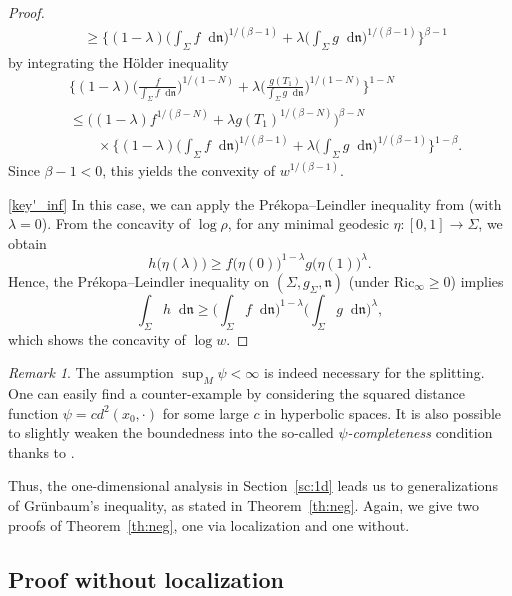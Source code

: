 \documentclass[sts]{imsart}
\theoremstyle{definition}
\theoremstyle{remark}
\newtheorem{remark}[theorem]{Remark}
\newcommand{\fn}{\mathfrak{n}}
\newcommand{\lra}{\longrightarrow}
\newcommand{\Ric}{\mathrm{Ric}}
\newcommand*\diff{\mathop{}\!\mathrm{d}}
\begin{document}
\begin{proof}
\begin{align*}
&\ge \biggl\{ (1-\lambda) \biggl( \int_\Sigma f \diff\fn \biggr)^{1/(\beta -1)} +\lambda \biggl( \int_\Sigma g \diff\fn \biggr)^{1/(\beta -1)} \biggr\}^{\beta -1}
\end{align*}
by integrating the H\"older inequality
\begin{align*}
&\biggl\{ (1-\lambda) \biggl( \frac{f}{\int_\Sigma f \diff\fn} \biggr)^{1/(1-N)}
 +\lambda \biggl( \frac{g(T_1)}{\int_\Sigma g \diff\fn} \biggr)^{1/(1-N)} \biggr\}^{1-N} \\
&\le \bigl( (1-\lambda) f^{1/(\beta-N)} +\lambda g(T_1)^{1/(\beta-N)} \bigr)^{\beta -N} \\
&\qquad \times
\biggl\{ (1-\lambda) \biggl( \int_\Sigma f \diff\fn \biggr)^{1/(\beta -1)} +\lambda \biggl( \int_\Sigma g \diff\fn \biggr)^{1/(\beta -1)} \biggr\}^{1-\beta}.
\end{align*}
Since $\beta -1<0$, this yields the convexity of $w^{1/(\beta -1)}$.

\eqref{key'_inf}
In this case, we can apply the Pr\'ekopa--Leindler inequality from \cite[Theorem~1.4]{CMS06} (with $\lambda=0$).
From the concavity of $\log\rho$, for any minimal geodesic $\eta\colon [0,1]\lra \Sigma$, we obtain
\[
h\bigl( \eta(\lambda) \bigr) 
\ge f\bigl( \eta(0) \bigr)^{1-\lambda} g\bigl( \eta(1) \bigr)^{\lambda}.
\]
Hence, the Pr\'ekopa--Leindler inequality on $(\Sigma,g_{\Sigma},\fn)$ (under $\Ric_{\infty} \ge 0$) implies
\[
\int_\Sigma h \diff\fn
\ge \biggl(\int_\Sigma f \diff\fn \biggr)^{1-\lambda} \biggl(\int_\Sigma g \diff\fn \biggr)^{\lambda},
\]
which shows the concavity of $\log w$.
\end{proof}

\begin{remark}\label{rm:psi}
The assumption $\sup_M \psi<\infty$ is indeed necessary for the splitting.
One can easily find a counter-example by considering the squared distance function $\psi=cd^2(x_0,\cdot)$ for some large $c$ in hyperbolic spaces.
It is also possible to slightly weaken the boundedness into the so-called \emph{$\psi$-completeness} condition thanks to \cite[Corollary~6.7]{Wy}.
\end{remark}

Thus, the one-dimensional analysis in Section~\ref{sc:1d} leads us to generalizations of Gr\"unbaum's inequality, as stated in Theorem~\ref{th:neg}.
Again, we give two proofs of Theorem~\ref{th:neg}, one via localization and one without.

\subsection{Proof without localization}\label{ssc:proof1_neg}%
\end{document}
